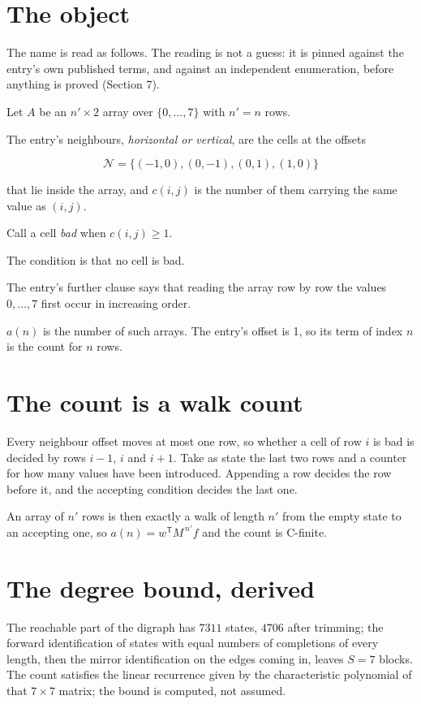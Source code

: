 \documentclass[11pt]{article}
\theoremstyle{definition}
\begin{document}
\section{The object}

The name is read as follows. The reading is not a guess: it is pinned against the entry's own published terms, and against an independent enumeration, before anything is proved (Section 7).

Let $A$ be an $n' \times 2$ array over $\{0,\dots,7\}$ with $n' = n$ rows.

The entry's neighbours, {\itshape horizontal or vertical}, are the cells at the offsets

\[\mathcal{N} = \{(-1,0), (0,-1), (0,1), (1,0)\}\]

that lie inside the array, and $c(i,j)$ is the number of them carrying the same value as $(i,j)$.

Call a cell {\itshape bad} when $c(i,j) \ge 1$.

The condition is that no cell is bad.

The entry's further clause says that reading the array row by row the values $0,\dots,7$ first occur in increasing order.

$a(n)$ is the number of such arrays. The entry's offset is 1, so its term of index $n$ is the count for $n$ rows.

\section{The count is a walk count}

Every neighbour offset moves at most one row, so whether a cell of row $i$ is bad is decided by rows $i-1$, $i$ and $i+1$. Take as state the last two rows and a counter for how many values have been introduced. Appending a row decides the row before it, and the accepting condition decides the last one.

An array of $n'$ rows is then exactly a walk of length $n'$ from the empty state to an accepting one, so $a(n) = w^{\mathsf T}M^{\,n'}f$ and the count is C-finite.

\section{The degree bound, derived}

The reachable part of the digraph has $7311$ states, $4706$ after trimming; the forward identification of states with equal numbers of completions of every length, then the mirror identification on the edges coming in, leaves $S = 7$ blocks. The count satisfies the linear recurrence given by the characteristic polynomial of that $7\times7$ matrix; the bound is computed, not assumed.
\end{document}
